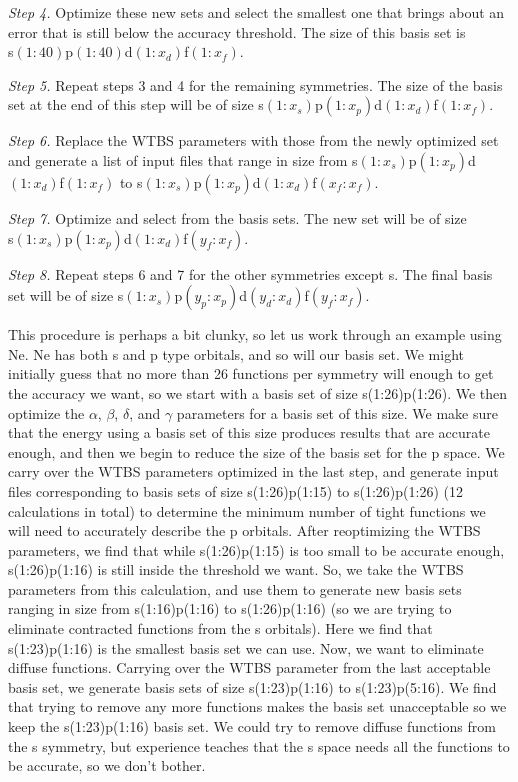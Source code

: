 \textit{Step 4.} Optimize these new sets and select the smallest one that brings about an error that is still below the accuracy threshold. The size of this basis set is \\ \mbox{s$(1:40)$p$(1:40)$d$(1:x_{d})$f$(1:x_{f})$}.

\textit{Step 5.} Repeat steps 3 and 4 for the remaining symmetries. The size of the basis set at the end of this step will be of size  \mbox{s$(1:x_{s})$p$(1:x_{p})$d$(1:x_{d})$f$(1:x_{f})$}.

\textit{Step 6.} Replace the WTBS parameters with those from the newly optimized set and generate a list of input files that range in size from  \mbox{s$(1:x_{s})$p$(1:x_{p})$d$(1:x_{d})$f$(1:x_{f})$} to  \mbox{s$(1:x_{s})$p$(1:x_{p})$d$(1:x_{d})$f$(x_{f}:x_{f})$}.

\textit{Step 7.} Optimize and select from the basis sets. The new set will be of size  \\ \mbox{s$(1:x_{s})$p$(1:x_{p})$d$(1:x_{d})$f$(y_{f}:x_{f})$}.

\textit{Step 8.} Repeat steps 6 and 7 for the other symmetries except s. The final basis set will be of size  \mbox{s$(1:x_{s})$p$(y_{p}:x_{p})$d$(y_{d}:x_{d})$f$(y_{f}:x_{f})$}.

This procedure is perhaps a bit clunky, so let us work through an example using Ne. Ne has both s and p type orbitals, and so will our basis set. We might initially guess that no more than 26 functions per symmetry will enough to get the accuracy we want, so we start with a basis set of size s(1:26)p(1:26). We then optimize the $\alpha$, $\beta$, $\delta$, and $\gamma$ parameters for a basis set of this size. We make sure that the energy using a basis set of this size produces results that are accurate enough, and then we begin to reduce the size of the basis set for the p space. We carry over the WTBS parameters optimized in the last step, and generate input files corresponding to basis sets of size s(1:26)p(1:15) to s(1:26)p(1:26) (12 calculations in total) to determine the minimum number of tight functions we will need to accurately describe the p orbitals. After reoptimizing the WTBS parameters, we find that while s(1:26)p(1:15) is too small to be accurate enough, s(1:26)p(1:16) is still inside the threshold we want. So, we take the WTBS parameters from this calculation, and use them to generate new basis sets ranging in size from s(1:16)p(1:16) to s(1:26)p(1:16) (so we are trying to eliminate contracted functions from the s orbitals). Here we find that s(1:23)p(1:16) is the smallest basis set we can use. Now, we want to eliminate diffuse functions. Carrying over the WTBS parameter from the last acceptable basis set, we generate basis sets of size s(1:23)p(1:16) to s(1:23)p(5:16). We find that trying to remove any more functions makes the basis set unacceptable so we keep the s(1:23)p(1:16) basis set. We could try to remove diffuse functions from the s symmetry, but experience teaches that the s space needs all the functions to be accurate, so we don't bother.


